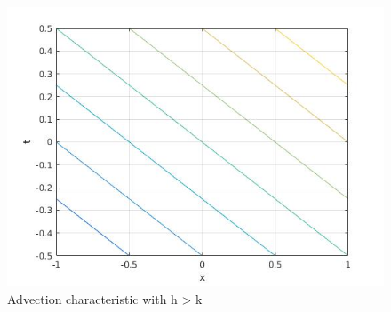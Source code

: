 \begin{figure}[H]
 \includegraphics[width=\textwidth]{Images/advection_h>k.jpg}
 \caption{Advection characteristic with h > k}
\end{figure}

